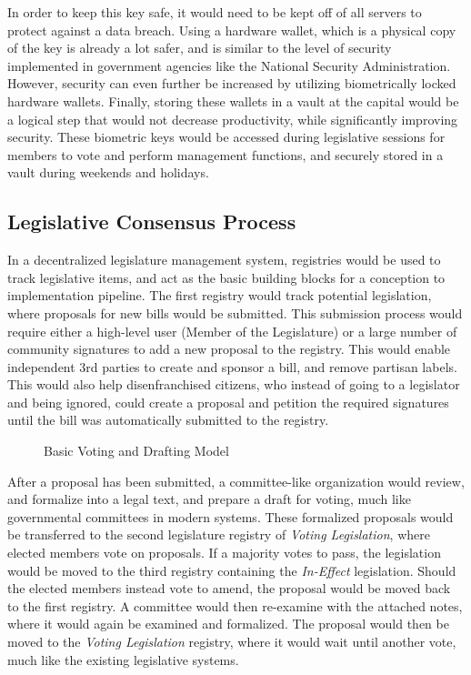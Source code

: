 \documentclass[letterpaper,twocolumn]{article}
\begin{document}
In order to keep this key safe, it would need to be kept off of all servers to protect against a data breach.  Using a hardware wallet, which is a physical copy of the key is already a lot safer, and is similar to the level of security implemented in government agencies like the National Security Administration.  However, security can even further be increased by utilizing biometrically locked hardware wallets.  Finally, storing these wallets in a vault at the capital would be a logical step that would not decrease productivity, while significantly improving security.  These biometric keys would be accessed during legislative sessions for members to vote and perform management functions, and securely stored in a vault during weekends and holidays.


\subsection*{Legislative Consensus Process}
In a decentralized legislature management system, registries would be used to track legislative items, and act as the basic building blocks for a conception to implementation pipeline.  The first registry would track potential legislation, where proposals for new bills would be submitted.  This submission process would require either a high-level user (Member of the Legislature) or a large number of community signatures to add a new proposal to the registry.  This would enable independent 3rd parties to create and sponsor a bill, and remove partisan labels.  This would also help disenfranchised citizens, who instead of going to a legislator and being ignored, could create a proposal and petition the required signatures until the bill was automatically submitted to the registry.

\begin{figure}
	\label{fig:voting_amendmant_process}\caption{Basic Voting and Drafting Model}
\end{figure}

After a proposal has been submitted, a committee-like organization would review, and formalize into a legal text, and prepare a draft for voting, much like governmental committees in modern systems.  These formalized proposals would be transferred to the second legislature registry of \textit{Voting Legislation}, where elected members vote on proposals.   If a majority votes to pass, the legislation would be moved to the third registry containing the \textit{In-Effect} legislation.  Should the elected members instead vote to amend, the proposal would be moved back to the first registry.  A committee would then re-examine with the attached notes, where it would again be examined and formalized.  The proposal would then be moved to the \textit{Voting Legislation} registry, where it would wait until another vote, much like the existing legislative systems.
\end{document}
